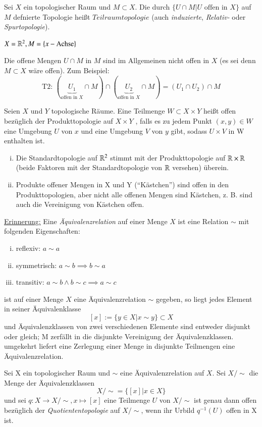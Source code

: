 \documentclass[a4paper,10pt]{scrartcl}
\begin{document}
\begin{df} Sei $ X $ ein topologischer Raum und $ M \subset X $. Die durch $ \{ U\cap M| U \text{ offen in } X \}$ auf $M$ defnierte Topologie heißt $ Teilraumtopologie $ (auch \emph{induzierte}, \emph{Relativ-} oder \emph{Spurtopologie}). 
\end{df}
\begin{ex*}
$X=\mathbb{R}^2, M=\{x-\text{Achse}\}$
\fixme[fig6]
\end{ex*}
\begin{att*}
Die offene Mengen $U\cap M$ in $ M $ sind im Allgemeinen nicht offen in $ X $ (es sei denn $ M\subset X $ wäre offen). Zum Beispiel:
\[
\text{T2: } (\underbrace{U_1}_{\text{offen in }X}\cap M)\cap (\underbrace{U_2}_{\text{offen in }X}\cap M)=(U_1\cap U_2)\cap M
\]
\end{att*}
\begin{df}
Seien $ X $ und $ Y $ topologische Räume. Eine Teilmenge $ W\subset X\times Y $ heißt offen bezüglich der Produkttopologie auf $ X\times Y $ , falls es zu jedem Punkt $ (x,y)\in W $ eine Umgebung $ U $ von $ x $ und eine Umgebung $ V $ von $ y $ gibt, sodass $ U\times V $ in W enthalten ist.
\fixme[fig7]
\end{df}
\begin{note*}
\begin{enumerate}[(i)]
\item Die Standardtopologie auf $ \mathbb{R}^2 $ stimmt mit der Produkttopologie auf $ \mathbb{R}\times \mathbb{R} $ (beide Faktoren mit der Standardtopologie von $ \mathbb{R} $ versehen) überein.
\item Produkte offener Mengen in X und Y ("`Kästchen"') sind offen in den Produkttopologien, aber nicht alle offenen Mengen sind Kästchen, z. B. sind auch die Vereinigung von Kästchen offen.
\fixme[fig8] 
\end{enumerate}
\underline{Erinnerung:} Eine \emph{Äquivalenzrelation} auf einer Menge $ X $ ist eine Relation $\sim$ mit folgenden Eigenschaften:
\begin{enumerate}[(i)]
\item reflexiv: $a\sim a$
\item symmetrisch: $a\sim b \implies b\sim a$
\item transitiv: $a\sim b \land b \sim c\implies a\sim c$
\end{enumerate}
ist auf einer Menge $ X $ eine Äquivalenzrelation $\sim$ gegeben, so liegt jedes Element in seiner Äquivalenklasse
\[
 [x]:=\{y\in X|x\sim y\} \subset X
\]
und Äquivalenzklassen von zwei verschiedenen Elemente sind entweder disjunkt oder gleich; M zerfällt in die disjunkte Vereinigung der Äquivalenzklassen.  umgekehrt liefert eine Zerlegung einer Menge in disjunkte Teilmengen eine Äquivalenzrelation.
\end{note*}
\begin{df}
Sei X ein topologischer Raum und $\sim$ eine Äquivalenzrelation auf $ X $.  Sei $X/\sim$ die Menge der Äquivalenzklassen 
\[
X/\sim=\{[x]|x\in X\}
\]
und sei $ q: X\to X/\sim, x\mapsto [x] $ eine Teilmenge $ U $ von $ X/\sim $ ist genau dann offen bezüglich der \emph{Quotiententopologie} auf $ X/\sim $, wenn ihr Urbild $ q^{-1}(U) $ offen in X ist.
\end{df}
\end{document}
